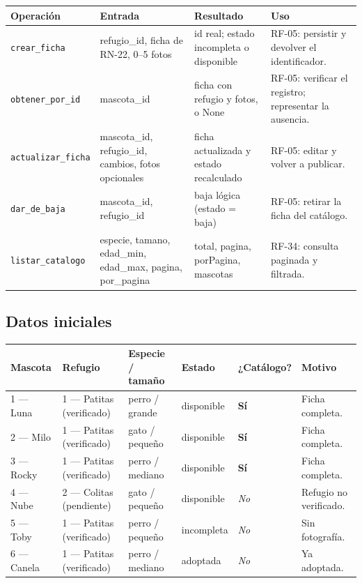 \documentclass[11pt,a4paper]{article}
\newcommand{\code}[1]{\texttt{#1}}
\newcommand{\thead}[1]{\textbf{#1}}
\begin{document}
{\footnotesize
\begin{tabularx}{\linewidth}{@{}V{1.0}V{0.95}V{1.15}V{0.9}@{}}
\toprule
\thead{Operación} & \thead{Entrada} & \thead{Resultado} & \thead{Uso} \\ \midrule
\code{crear\_ficha} & refugio\_id, ficha de RN-22, 0--5 fotos &
id real; estado incompleta o disponible & RF-05: persistir y devolver el
identificador. \\
\code{obtener\_por\_id} & mascota\_id & ficha con refugio y fotos, o None &
RF-05: verificar el registro; representar la ausencia. \\
\code{actualizar\_ficha} & mascota\_id, refugio\_id, cambios, fotos opcionales &
ficha actualizada y estado recalculado & RF-05: editar y volver a publicar. \\
\code{dar\_de\_baja} & mascota\_id, refugio\_id & baja lógica (estado = baja) &
RF-05: retirar la ficha del catálogo. \\
\code{listar\_catalogo} & especie, tamano, edad\_min, edad\_max, pagina,
por\_pagina & total, pagina, porPagina, mascotas &
RF-34: consulta paginada y filtrada. \\
\bottomrule
\end{tabularx}
}

\subsection{Datos iniciales}

{\footnotesize
\begin{tabularx}{\linewidth}{@{}V{0.8}V{1.2}V{0.9}V{0.75}Z{0.8}V{1.55}@{}}
\toprule
\thead{Mascota} & \thead{Refugio} & \thead{Especie / tamaño} &
\thead{Estado} & \thead{¿Catálogo?} & \thead{Motivo} \\  --- Luna & 1 --- Patitas (verificado) & perro / grande & disponible &
\textbf{Sí} & Ficha completa. \\
2 --- Milo & 1 --- Patitas (verificado) & gato / pequeño & disponible &
\textbf{Sí} & Ficha completa. \\
3 --- Rocky & 1 --- Patitas (verificado) & perro / mediano & disponible &
\textbf{Sí} & Ficha completa. \\
4 --- Nube & 2 --- Colitas (pendiente) & gato / pequeño & disponible &
\textit{No} & Refugio no verificado. \\
5 --- Toby & 1 --- Patitas (verificado) & perro / pequeño & incompleta &
\textit{No} & Sin fotografía. \\
6 --- Canela & 1 --- Patitas (verificado) & perro / mediano & adoptada &
\textit{No} & Ya adoptada. \\
\bottomrule
\end{tabularx}
}
\end{document}
